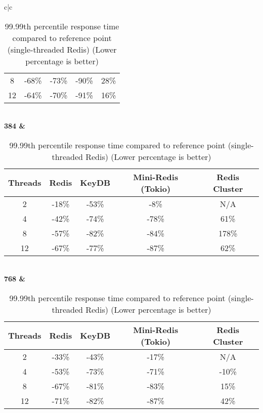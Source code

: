 \begin{center}
\begin{table}
\begin{tabular}{c|c}
\begin{tabular}{c|cccc}
                8 &  -68\% &  -73\% &               -90\% &           28\% \\
               12 &  -64\% &  -70\% &               -91\% &           16\% \\
                \bottomrule
            \end{tabular} \\
            \bf{384} & \begin{tabular}{c|cccc}
                \toprule
                Threads & Redis & KeyDB & Mini-Redis (Tokio) & Redis Cluster \\
                \midrule
                2 &  -18\% &  -53\% &                -8\% &           N/A \\
                4 &  -42\% &  -74\% &               -78\% &           61\% \\
                8 &  -57\% &  -82\% &               -84\% &          178\% \\
               12 &  -67\% &  -77\% &               -87\% &           62\% \\
                \bottomrule
            \end{tabular} \\
            \bf{768} & \begin{tabular}{c|cccc}
                \toprule
                Threads & Redis & KeyDB & Mini-Redis (Tokio) & Redis Cluster \\
                \midrule
                2 &  -33\% &  -43\% &               -17\% &           N/A \\
                4 &  -53\% &  -73\% &               -71\% &          -10\% \\
                8 &  -67\% &  -81\% &               -83\% &           15\% \\
               12 &  -71\% &  -82\% &               -87\% &           42\% \\
                \bottomrule
            \end{tabular} \\
            \bottomrule
        \end{tabular}
        \caption{99.99th percentile response time compared to reference point (single-threaded Redis) (Lower percentage is better)}
        \label{tbl:table_of_figures_9999_response_times}
    \end{table}
\end{center}